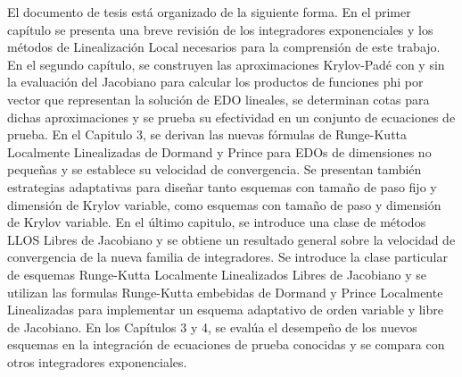 
El documento de tesis está organizado de la siguiente forma. En el primer capítulo se presenta una breve revisión de los integradores exponenciales y los métodos de Linealización Local necesarios para la comprensión de este trabajo. En el segundo capítulo, se construyen las aproximaciones Krylov-Padé con y sin la evaluación del Jacobiano para calcular los productos de funciones phi por vector que representan la solución de EDO lineales, se determinan cotas para dichas aproximaciones y se prueba su efectividad en un conjunto de ecuaciones de prueba. En el Capitulo 3, se derivan las nuevas fórmulas de Runge-Kutta Localmente Linealizadas de Dormand y Prince para EDOs de dimensiones no pequeñas y se establece su velocidad de convergencia. Se presentan también estrategias adaptativas para diseñar tanto esquemas con tamaño de paso fijo y dimensión de Krylov variable, como esquemas con tamaño de paso y dimensión de Krylov variable. En el último capitulo, se introduce una clase de métodos LLOS Libres de Jacobiano y se obtiene un resultado general sobre la velocidad de convergencia de la nueva familia de integradores. Se introduce la clase particular de esquemas Runge-Kutta Localmente Linealizados Libres de Jacobiano y se utilizan las formulas Runge-Kutta embebidas de Dormand y Prince Localmente Linealizadas para implementar un esquema adaptativo de orden variable y libre de Jacobiano.
En los Capítulos 3 y 4, se evalúa el desempeño de los nuevos esquemas en la integración de ecuaciones de prueba conocidas y se compara con otros integradores exponenciales.




